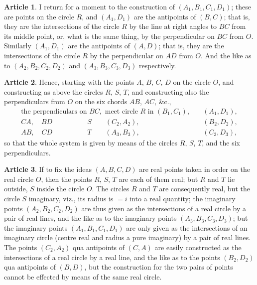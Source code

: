 \documentclass[11pt,a4paper]{article}
\theoremstyle{definition}
\newtheorem{art}{Article}
\begin{document}
\begin{art}
I return for a moment to the construction of $(A_{1}, B_{1}, C_{1}, D_{1})$; these are points on the circle $R$, and $(A_{1}, D_{1})$ are the antipoints of $(B, C)$; that is, they are the intersections of the circle $R$ by the line at right angles to $BC$ from its middle point, or, what is the same thing, by the perpendicular on $BC$ from $O$. Similarly $(A_{1}, D_{1})$ are the antipoints of $(A, D)$; that is, they are the intersections of the circle $R$ by the perpendicular on $AD$ from $O$. And the like as to $(A_{2}, B_{2}, C_{2}, D_{2})$ and $(A_{3}, B_{3}, C_{3}, D_{3})$ respectively.
\end{art}

\begin{art}
Hence, starting with the points $A$, $B$, $C$, $D$ on the circle $O$, and constructing as above the circles $R$, $S$, $T$, and constructing also the perpendiculars from $O$ on the six chords $AB$, $AC$, \&c.,
\begin{align*}
\text{the perpendiculars on } BC, \text{ meet circle } R \text{ in } (B_{1}, C_{1}), \quad &(A_{1}, D_{1}), \\
CA, \quad BD \quad\quad\quad\quad\quad S \quad\quad (C_{2}, A_{2}), \quad &(B_{2}, D_{2}), \\
AB, \quad CD \quad\quad\quad\quad\quad T \quad\quad (A_{3}, B_{3}), \quad &(C_{3}, D_{3}),
\end{align*}
so that the whole system is given by means of the circles $R$, $S$, $T$, and the six perpendiculars.
\end{art}

\begin{art}
If to fix the ideas $(A, B, C, D)$ are real points taken in order on the real circle $O$, then the points $R$, $S$, $T$ are each of them real; but $R$ and $T$ lie outside, $S$ inside the circle $O$. The circles $R$ and $T$ are consequently real, but the circle $S$ imaginary, viz., its radius is $= i$ into a real quantity; the imaginary points $(A_{2}, B_{2}, C_{2}, D_{2})$ are thus given as the intersections of a real circle by a pair of real lines, and the like as to the imaginary points $(A_{3}, B_{3}, C_{3}, D_{3})$; but the imaginary points $(A_{1}, B_{1}, C_{1}, D_{1})$ are only given as the intersections of an imaginary circle (centre real and radius a pure imaginary) by a pair of real lines. The points $(C_{2}, A_{2})$ qua antipoints of $(C, A)$ are easily constructed as the intersections of a real circle by a real line, and the like as to the points $(B_{2}, D_{2})$ qua antipoints of $(B, D)$, but the construction for the two pairs of points cannot be effected by means of the same real circle.
\end{art}
\end{document}

